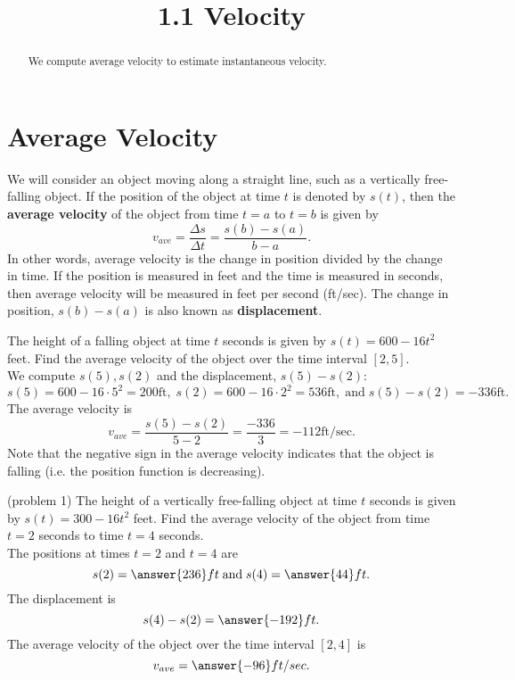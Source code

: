 \documentclass{ximera}
\title{1.1 Velocity}
\begin{document}
\begin{abstract}
We compute average velocity to estimate instantaneous velocity.
\end{abstract}

\maketitle

\section{Average Velocity}
We will consider an object moving along a straight line, such as a vertically free-falling object. If the position of the object at time $t$
is denoted by $s(t)$, then the \textbf{average velocity} of the object from time $t = a$ to $t = b$ is given by 
\[
v_{ave} = \frac{\Delta s}{\Delta t} = \frac{s(b) - s(a)}{b-a}.
\]
In other words, average velocity is the change in position divided by the change in time. 
If the position is measured in feet and the time is measured in seconds, then average velocity will be 
measured in feet per second (ft/sec). The change in position, $s(b) - s(a)$ is also known as \textbf{displacement}.


\begin{example}[example 1]
The height of a falling object at time $t$ seconds is given by $s(t) = 600-16t^2$ feet.
Find the average velocity of the object over the time interval $[2, 5]$.\\
We compute $s(5), s(2)$ and the displacement, $s(5) - s(2)$:
\[
s(5) = 600 - 16\cdot 5^2 = 200 \text{ft}, \; s(2) = 600 - 16 \cdot 2^2 = 536 \text{ft}, \; \text {and} \; s(5) - s(2) = -336 \text{ft}.
\]
The average velocity is
\[
v_{ave} = \frac{s(5) - s(2)}{5-2} = \frac{-336}{3} = - 112 \text{ft/sec}.
\]
Note that the negative sign in the average velocity indicates that the object is falling (i.e. the position function is decreasing).
\end{example}



\begin{problem}(problem 1)
The height of a vertically free-falling object at time $t$ seconds is given by $s(t) = 300 - 16t^2$ feet.
Find the average velocity of the object from time $t = 2$ seconds to time $t = 4$ seconds.\\
The positions at times $t = 2$ and $t= 4$ are
\[
s(2) = \answer{236}ft \; \text{and} \; s(4) = \answer{44}ft.
\]
The displacement is 
\[
s(4) - s(2) = \answer{-192}ft.
\]
The average velocity of the object over the time interval $[2,4]$ is 
\[
v_{ave} = \answer{-96}ft/sec.
\]

\end{problem}
\end{document}
